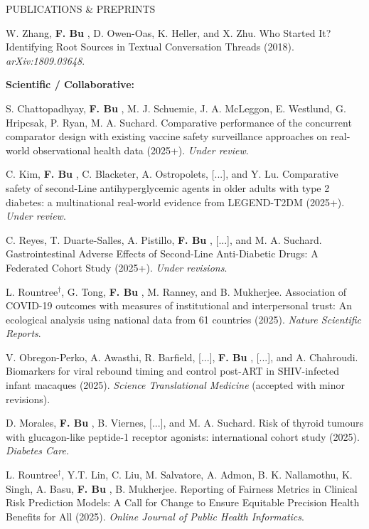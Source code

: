 \documentclass{resume} %
\newcommand{\myName}[1]{
	\textbf{#1}
}
\begin{document}
\begin{rSection}{PUBLICATIONS \& PREPRINTS}
\smallskip

W. Zhang, \myName{F. Bu}, D. Owen-Oas, K. Heller, and X. Zhu. 
Who Started It? Identifying Root Sources in Textual Conversation Threads (2018). \emph{arXiv:1809.03648}.

\medskip

\hspace{-.2in} \textbf{Scientific / Collaborative:}

S. Chattopadhyay, \myName{F. Bu}, M. J. Schuemie, J. A. McLeggon, E. Westlund, G. Hripcsak, P. Ryan, M. A. Suchard. 
Comparative performance of the concurrent comparator design with existing vaccine safety surveillance approaches on real-world observational health data (2025+). \emph{Under review}. 

\smallskip 

C. Kim, \myName{F. Bu}, C. Blacketer, A. Ostropolets, [...], and Y. Lu. Comparative safety of second-Line antihyperglycemic agents in older adults with type 2 diabetes: a multinational real-world evidence from LEGEND-T2DM (2025+). \emph{Under review}.  

\smallskip

C. Reyes, T. Duarte-Salles, A. Pistillo, \myName{F. Bu}, [...], and M. A. Suchard. Gastrointestinal Adverse Effects of Second-Line Anti-Diabetic Drugs: A Federated Cohort Study (2025+). \emph{Under revisions}. 

\smallskip 

L. Rountree$^\dagger$, G. Tong, \myName{F. Bu}, M. Ranney, and B. Mukherjee. Association of COVID-19 outcomes with measures of institutional and interpersonal trust: An ecological analysis using national data from 61 countries (2025). \emph{Nature Scientific Reports}.   

\smallskip 

V. Obregon-Perko, A. Awasthi, R. Barfield, [...], \myName{F. Bu}, [...], and A. Chahroudi. Biomarkers for viral rebound timing and control post-ART in SHIV-infected infant macaques (2025). \emph{Science Translational Medicine} (accepted with minor revisions).

\smallskip 

D. Morales, \myName{F. Bu}, B. Viernes, [...], and M. A. Suchard. Risk of thyroid tumours with glucagon-like peptide-1 receptor agonists: international cohort study (2025). \emph{Diabetes Care.} 

\smallskip 

L. Rountree$^\dagger$, Y.T.  Lin, C. Liu, M. Salvatore, A.  Admon, B. K. Nallamothu, K. Singh, A. Basu, \myName{F. Bu}, B. Mukherjee. Reporting of Fairness Metrics in Clinical Risk Prediction Models: A Call for Change to Ensure Equitable Precision Health Benefits for All (2025). \emph{Online Journal of Public Health Informatics}.


\end{rSection}
\end{document}
